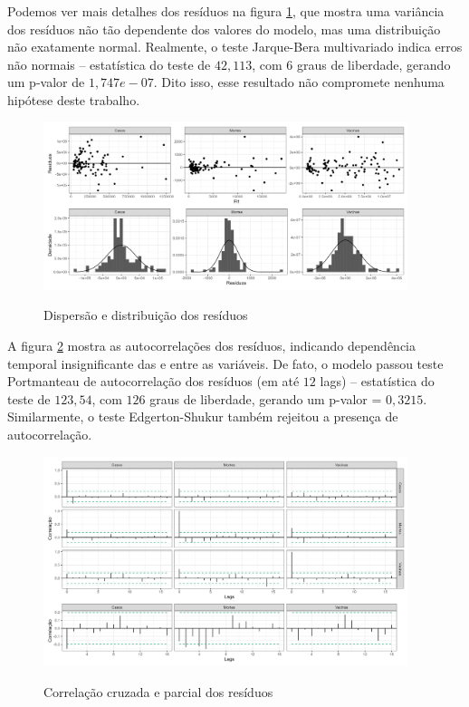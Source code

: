 \documentclass[
    article,
	12pt,				%
	oneside,			%
	a4paper,			%
	english,			%
	brazil,				%
	hyperref = {colorlinks, citecolor=c1d, linkcolor=c2d, urlcolor=c3d, colorlinks}
	]{abntex2}
\newcounter{j}
\begin{document}
\begin{apendicesenv}
Podemos ver mais detalhes dos resíduos na figura \ref{fig:varresdist}, que mostra uma variância dos resíduos não tão dependente dos valores do modelo, mas uma distribuição não exatamente normal. Realmente, o teste Jarque-Bera multivariado indica erros não normais -- estatística do teste de $42,113$, com $6$ graus de liberdade, gerando um p-valor de $1,747e-07$. Dito isso, esse resultado não compromete nenhuma hipótese deste trabalho.

\begin{figure}[H]
    \centering
    \caption{Dispersão e distribuição dos resíduos}
    \includegraphics[width = 0.95\textwidth]{Figuras/diag_disp-dist.png}
    \label{fig:varresdist}
\end{figure}

A figura \ref{fig:varresacf} mostra as autocorrelações dos resíduos, indicando dependência temporal insignificante das e entre as variáveis. De fato, o modelo passou teste Portmanteau de autocorrelação dos resíduos (em até $12$ lags) -- estatística do teste de $123,54$, com $126$ graus de liberdade, gerando um p-valor = $0,3215$. Similarmente, o teste Edgerton-Shukur também rejeitou a presença de autocorrelação.

\begin{figure}[H]
    \centering
    \caption{Correlação cruzada e parcial dos resíduos}
    \includegraphics[width = 0.95\textwidth]{Figuras/diag_acf.png}
    \label{fig:varresacf}
\end{figure}


\end{apendicesenv}
\end{document}
